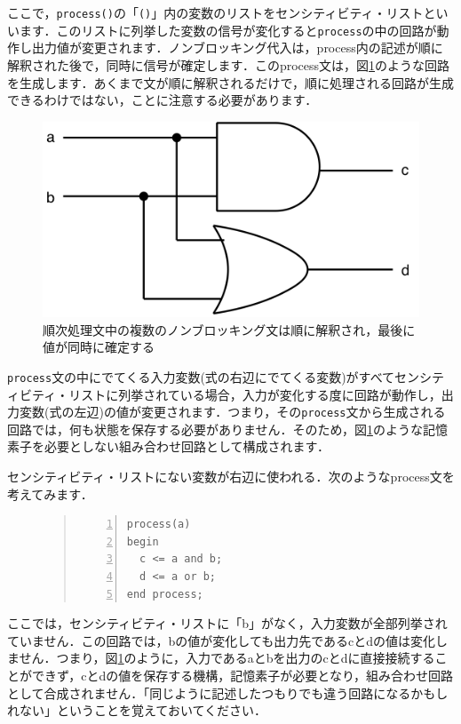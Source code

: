 \documentclass[a4paper,dvipdfmx]{jsarticle}
\begin{document}
ここで，\verb|process()|の「\verb|()|」内の変数のリストをセンシティビティ・リストといいます．このリストに列挙した変数の信号が変化すると\verb|process|の中の回路が動作し出力値が変更されます．ノンブロッキング代入は，process内の記述が順に解釈された後で，同時に信号が確定します．このprocess文は，図\ref{fig:process_example}のような回路を生成します．あくまで文が順に解釈されるだけで，順に処理される回路が生成できるわけではない，ことに注意する必要があります．

 \begin{figure}[H]
  \begin{center}
   \includegraphics[width=.4\textwidth]{chapter02_figures/process_example.png}
  \end{center}
  \caption{順次処理文中の複数のノンブロッキング文は順に解釈され，最後に値が同時に確定する \label{fig:process_example}}
 \end{figure}

\verb|process|文の中にでてくる入力変数(式の右辺にでてくる変数)がすべてセンシティビティ・リストに列挙されている場合，入力が変化する度に回路が動作し，出力変数(式の左辺)の値が変更されます．つまり，その\verb|process|文から生成される回路では，何も状態を保存する必要がありません．そのため，図\ref{fig:process_example}のような記憶素子を必要としない組み合わせ回路として構成されます．

センシティビティ・リストにない変数が右辺に使われる．次のようなprocess文を考えてみます．
\begin{figure}[H]
\begin{quote}
\begin{Verbatim}[frame=single, numbers=left, baselinestretch=0.8]
process(a)
begin
  c <= a and b;
  d <= a or b;
end process;
\end{Verbatim}
\end{quote}
\end{figure}
ここでは，センシティビティ・リストに「b」がなく，入力変数が全部列挙されていません．この回路では，bの値が変化しても出力先であるcとdの値は変化しません．つまり，図\ref{fig:process_example}のように，入力であるaとbを出力のcとdに直接接続することができず，cとdの値を保存する機構，記憶素子が必要となり，組み合わせ回路として合成されません．「同じように記述したつもりでも違う回路になるかもしれない」ということを覚えておいてください．
\end{document}
